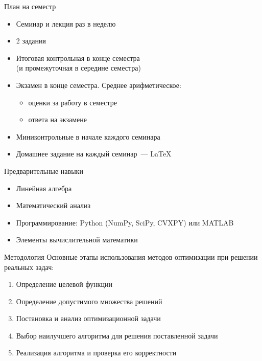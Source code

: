 \documentclass[12pt]{beamer}
\begin{document}
\begin{frame}{План на семестр}
\begin{itemize}
\item Семинар и лекция раз в неделю
\item 2 задания
\item Итоговая контрольная в конце семестра \\ (и промежуточная в середине семестра)
\item Экзамен в конце семестра. Среднее арифметическое:
\begin{itemize}
\item оценки за работу в семестре
\item ответа на экзамене
\end{itemize}
\item Миниконтрольные в начале каждого семинара
\item Домашнее задание на каждый семинар~--- \LaTeX
\end{itemize}
\end{frame}

\begin{frame}{Предварительные навыки}
\begin{itemize}
\item Линейная алгебра
\item Математический анализ
\item Программирование: Python (NumPy, SciPy, CVXPY) или MATLAB
\item Элементы вычислительной математики
\end{itemize}
\end{frame}

\begin{frame}{Методология}
Основные этапы использования методов оптимизации при решении реальных задач:
\begin{enumerate}
\item Определение целевой функции
\item Определение допустимого множества решений
\item Постановка и анализ оптимизационной задачи
\item Выбор наилучшего алгоритма для решения поставленной задачи
\item Реализация алгоритма и проверка его корректности
\end{enumerate}

\end{frame}
\end{document}
